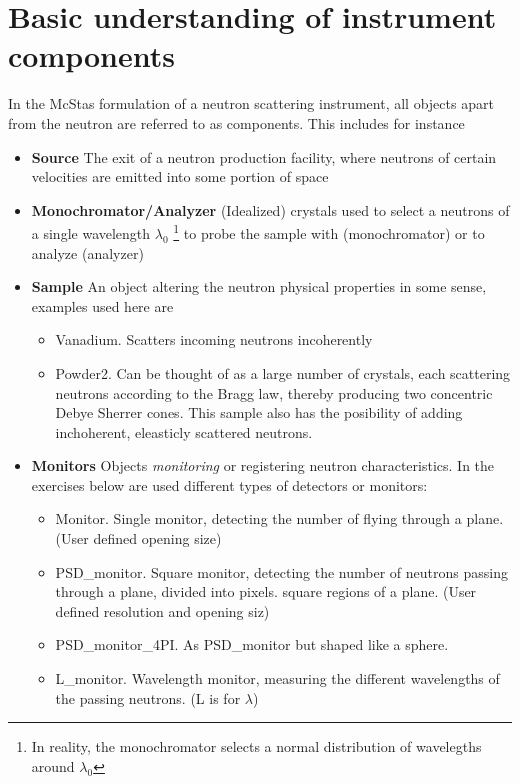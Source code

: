 \documentclass[a4paper]{article}
\begin{document}
\section{Basic understanding of instrument components}
In the McStas formulation of a neutron scattering instrument, all
objects apart from the neutron are referred to as components. This
includes for instance
\begin{itemize}
\item{{\bf Source} The exit of a neutron production facility, where
    neutrons of certain velocities are emitted into some
    portion of space}
\item{{\bf Monochromator/Analyzer} (Idealized) crystals used to select a
    neutrons of a single wavelength $\lambda_0$ \footnote{In reality,
    the monochromator selects a normal distribution of wavelegths
    around $\lambda_0$} to probe the sample with (monochromator) or to 
    analyze (analyzer)}
\item{{\bf Sample} An object altering the neutron physical properties
    in some sense, examples used here are}
  \begin{itemize}
    \item{Vanadium. Scatters incoming neutrons incoherently}
    \item{Powder2. Can be thought of as a large number of crystals,
        each scattering neutrons according to the Bragg law, thereby
        producing two concentric Debye Sherrer cones. This sample also
        has the posibility of adding inchoherent, eleasticly scattered
        neutrons.}
    \end{itemize}
\item{{\bf Monitors} Objects \emph{monitoring} or registering neutron
    characteristics. In the exercises below are used different types
    of detectors or monitors:}
  \begin{itemize}
    \item{Monitor. Single monitor, detecting the number of flying
        through a plane. (User defined opening size)}
    \item{PSD\_monitor. Square monitor, detecting the number of
        neutrons passing through a plane, divided into
        pixels. square regions of a plane. (User defined resolution 
        and opening siz)}
    \item{PSD\_monitor\_4PI. As PSD\_monitor but shaped like a sphere.}
    \item{L\_monitor. Wavelength monitor, measuring the different
        wavelengths of the passing neutrons. (L is for $\lambda$)}

\end{itemize}
\end{itemize}
\end{document}

